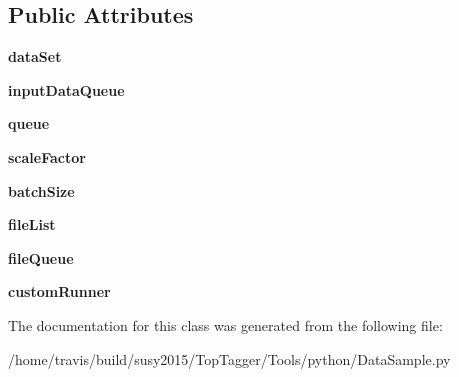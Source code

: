 \subsection*{Public Attributes}
\begin{DoxyCompactItemize}
\item 
\hypertarget{classDataSample_1_1DataSample_afb978dd6a2f37f5c485c54e0522c519a}{{\bfseries data\-Set}}\label{classDataSample_1_1DataSample_afb978dd6a2f37f5c485c54e0522c519a}

\item 
\hypertarget{classDataSample_1_1DataSample_a7da3ab30da6f0a9798aba2741c989ba8}{{\bfseries input\-Data\-Queue}}\label{classDataSample_1_1DataSample_a7da3ab30da6f0a9798aba2741c989ba8}

\item 
\hypertarget{classDataSample_1_1DataSample_acb8e500209d8092ebec32e630d8ee98a}{{\bfseries queue}}\label{classDataSample_1_1DataSample_acb8e500209d8092ebec32e630d8ee98a}

\item 
\hypertarget{classDataSample_1_1DataSample_a1edf25a363d46700d35180dbc19a0d70}{{\bfseries scale\-Factor}}\label{classDataSample_1_1DataSample_a1edf25a363d46700d35180dbc19a0d70}

\item 
\hypertarget{classDataSample_1_1DataSample_a0053c8db256081a6f6a87c6113e5997d}{{\bfseries batch\-Size}}\label{classDataSample_1_1DataSample_a0053c8db256081a6f6a87c6113e5997d}

\item 
\hypertarget{classDataSample_1_1DataSample_a1dc78865330341b82476c9718e0b2aae}{{\bfseries file\-List}}\label{classDataSample_1_1DataSample_a1dc78865330341b82476c9718e0b2aae}

\item 
\hypertarget{classDataSample_1_1DataSample_a130d097d0226e267d775230b858c56b3}{{\bfseries file\-Queue}}\label{classDataSample_1_1DataSample_a130d097d0226e267d775230b858c56b3}

\item 
\hypertarget{classDataSample_1_1DataSample_a61077c185f07df04d8df3b81439235fd}{{\bfseries custom\-Runner}}\label{classDataSample_1_1DataSample_a61077c185f07df04d8df3b81439235fd}

\end{DoxyCompactItemize}


The documentation for this class was generated from the following file\-:\begin{DoxyCompactItemize}
\item 
/home/travis/build/susy2015/\-Top\-Tagger/\-Tools/python/Data\-Sample.\-py\end{DoxyCompactItemize}
